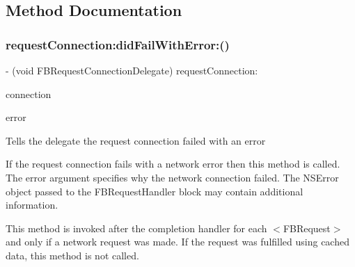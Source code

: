 \subsection{Method Documentation}
\mbox{\label{protocolFBRequestConnectionDelegate_01-p_a2625e8e847596ba8b2baf3a30fe24268}} 
\subsubsection{\texorpdfstring{request\+Connection\+:did\+Fail\+With\+Error\+:()}{requestConnection:didFailWithError:()}\hspace{0.1cm}{\footnotesize\ttfamily [1/5]}}
{\footnotesize\ttfamily -\/ (void F\+B\+Request\+Connection\+Delegate) request\+Connection\+: \begin{DoxyParamCaption}\item[{(\hyperlink{interfaceFBRequestConnection}{F\+B\+Request\+Connection} $\ast$)}]{connection }\item[{didFailWithError:(N\+S\+Error $\ast$)}]{error }\end{DoxyParamCaption}\hspace{0.3cm}{\ttfamily [optional]}}

Tells the delegate the request connection failed with an error

If the request connection fails with a network error then this method is called. The {\ttfamily error} argument specifies why the network connection failed. The {\ttfamily N\+S\+Error} object passed to the F\+B\+Request\+Handler block may contain additional information.

This method is invoked after the completion handler for each $<$\+F\+B\+Request$>$ and only if a network request was made. If the request was fulfilled using cached data, this method is not called.


